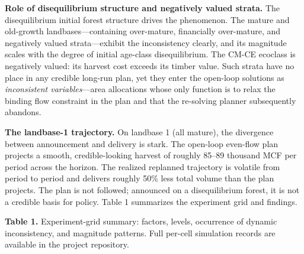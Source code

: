 \documentclass[12pt]{article}
\begin{document}
\textbf{Role of disequilibrium structure and negatively valued strata.} The disequilibrium initial forest structure drives the phenomenon. The mature and old-growth landbases---containing over-mature, financially over-mature, and negatively valued strata---exhibit the inconsistency clearly, and its magnitude scales with the degree of initial age-class disequilibrium. The CM-CE ecoclass is negatively valued: its harvest cost exceeds its timber value. Such strata have no place in any credible long-run plan, yet they enter the open-loop solutions as \emph{inconsistent variables}---area allocations whose only function is to relax the binding flow constraint in the plan and that the re-solving planner subsequently abandons.

\textbf{The landbase-1 trajectory.} On landbase 1 (all mature), the divergence between announcement and delivery is stark. The open-loop even-flow plan projects a smooth, credible-looking harvest of roughly 85--89 thousand MCF per period across the horizon. The realized replanned trajectory is volatile from period to period and delivers roughly 50\% less total volume than the plan projects. The plan is not followed; announced on a disequilibrium forest, it is not a credible basis for policy. Table 1 summarizes the experiment grid and findings.

\textbf{Table 1.} Experiment-grid summary: factors, levels, occurrence of dynamic inconsistency, and magnitude patterns. Full per-cell simulation records are available in the project repository.
\end{document}
